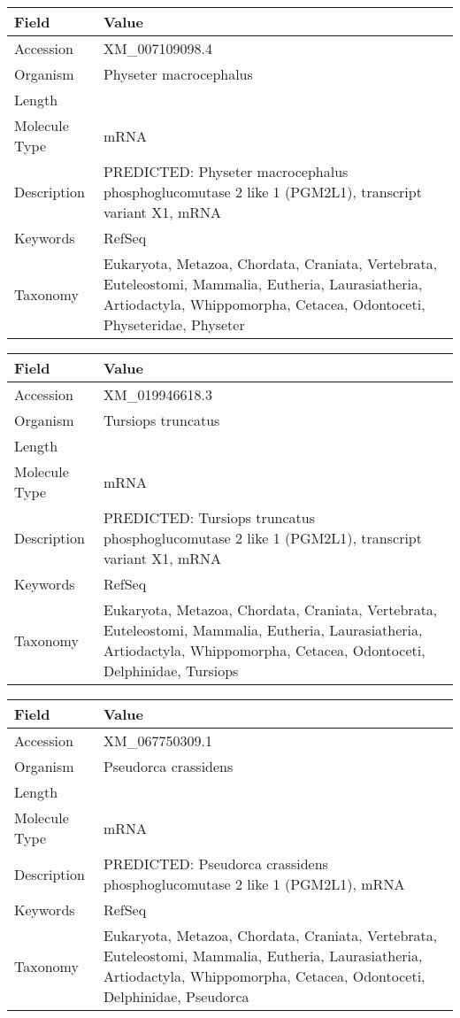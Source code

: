 \documentclass[10pt]{article}
\begin{document}
{\footnotesize
\begin{longtable}{>{\raggedright\arraybackslash}p{4.5cm} >{\raggedright\arraybackslash}p{11.5cm}}
\textbf{Field} & \textbf{Value} \\
\hline
Accession & XM\_007109098.4 \\
Organism & Physeter macrocephalus \\
Length & 2830 \\
Molecule Type & mRNA \\
Description & PREDICTED: Physeter macrocephalus phosphoglucomutase 2 like 1 (PGM2L1), transcript variant X1, mRNA \\
Keywords & RefSeq \\
Taxonomy & Eukaryota, Metazoa, Chordata, Craniata, Vertebrata, Euteleostomi, Mammalia, Eutheria, Laurasiatheria, Artiodactyla, Whippomorpha, Cetacea, Odontoceti, Physeteridae, Physeter \\
\end{longtable}
}

{\footnotesize
\begin{longtable}{>{\raggedright\arraybackslash}p{4.5cm} >{\raggedright\arraybackslash}p{11.5cm}}
\textbf{Field} & \textbf{Value} \\
\hline
Accession & XM\_019946618.3 \\
Organism & Tursiops truncatus \\
Length & 2841 \\
Molecule Type & mRNA \\
Description & PREDICTED: Tursiops truncatus phosphoglucomutase 2 like 1 (PGM2L1), transcript variant X1, mRNA \\
Keywords & RefSeq \\
Taxonomy & Eukaryota, Metazoa, Chordata, Craniata, Vertebrata, Euteleostomi, Mammalia, Eutheria, Laurasiatheria, Artiodactyla, Whippomorpha, Cetacea, Odontoceti, Delphinidae, Tursiops \\
\end{longtable}
}

{\footnotesize
\begin{longtable}{>{\raggedright\arraybackslash}p{4.5cm} >{\raggedright\arraybackslash}p{11.5cm}}
\textbf{Field} & \textbf{Value} \\
\hline
Accession & XM\_067750309.1 \\
Organism & Pseudorca crassidens \\
Length & 8020 \\
Molecule Type & mRNA \\
Description & PREDICTED: Pseudorca crassidens phosphoglucomutase 2 like 1 (PGM2L1), mRNA \\
Keywords & RefSeq \\
Taxonomy & Eukaryota, Metazoa, Chordata, Craniata, Vertebrata, Euteleostomi, Mammalia, Eutheria, Laurasiatheria, Artiodactyla, Whippomorpha, Cetacea, Odontoceti, Delphinidae, Pseudorca \\
\end{longtable}
}
\end{document}
